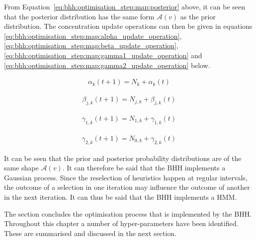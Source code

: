 From Equation~\eqref{eq:bhh:optimisation_step:map:posterior} above, it can be seen that the posterior distribution has the same form $\mathcal{A}(v)$ as the prior distribution. The concentration update operations can then be given in equations \ref{eq:bhh:optimisation_step:map:alpha_update_operation}, \ref{eq:bhh:optimisation_step:map:beta_update_operation}, \ref{eq:bhh:optimisation_step:map:gamma1_update_operation} and \ref{eq:bhh:optimisation_step:map:gamma2_update_operation} below.

\begin{equation}
      \label{eq:bhh:optimisation_step:map:alpha_update_operation}
      \begin{split}
            \alpha_{k}(t+1) = N_{k} + \alpha_{k}(t)
      \end{split}
\end{equation}

\begin{equation}
      \label{eq:bhh:optimisation_step:map:beta_update_operation}
      \begin{split}
            \beta_{j,k}(t+1) = N_{j,k} + \beta_{j,k}(t)
      \end{split}
\end{equation}

\begin{equation}
      \label{eq:bhh:optimisation_step:map:gamma1_update_operation}
      \begin{split}
            \gamma_{1,k}(t+1) = N_{1,k} + \gamma_{1,k}(t)
      \end{split}
\end{equation}

\begin{equation}
      \label{eq:bhh:optimisation_step:map:gamma2_update_operation}
      \begin{split}
            \gamma_{2,k}(t+1) = N_{0,k} + \gamma_{2,k}(t)
      \end{split}
\end{equation}

It can be seen that the prior and posterior probability distributions are of the same shape $\mathcal{A}(v)$. It can therefore be said that the \ac{BHH} implements a Gaussian process. Since the reselection of heuristics happen at regular intervals, the outcome of a selection in one iteration may influence the outcome of another in the next iteration. It can thus be said that the \ac{BHH} implements a \ac{HMM}.

The section concludes the optimisation process that is implemented by the \ac{BHH}. Throughout this chapter a number of hyper-parameters have been identified. These are summarised and discussed in the next section.


